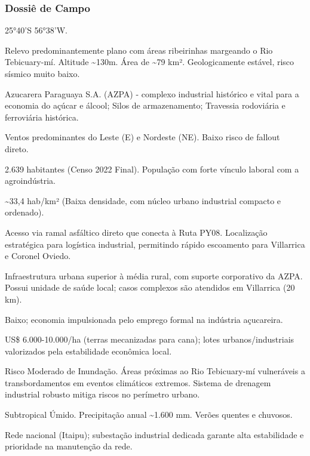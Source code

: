 \subsubsection{Dossiê de Campo}
\begin{description}[style=nextline,leftmargin=0.5cm,font=\bfseries]
\item[Coordenadas]  25°40'S 56°38'W.
\item[Topografia]  Relevo predominantemente plano com áreas ribeirinhas margeando o Rio Tebicuary-mí. Altitude \textasciitilde 130m. Área de \textasciitilde 79 km². Geologicamente estável, risco sísmico muito baixo.
\item[Alvos Estratégicos]  Azucarera Paraguaya S.A. (AZPA) - complexo industrial histórico e vital para a economia do açúcar e álcool; Silos de armazenamento; Travessia rodoviária e ferroviária histórica.
\item[Fallout]  Ventos predominantes do Leste (E) e Nordeste (NE). Baixo risco de fallout direto.
\item[População]  2.639 habitantes (Censo 2022 Final). População com forte vínculo laboral com a agroindústria.
\item[Densidade]  \textasciitilde 33,4 hab/\allowbreak km² (Baixa densidade, com núcleo urbano industrial compacto e ordenado).
\item[Vias de Acesso]  Acesso via ramal asfáltico direto que conecta à Ruta PY08. Localização estratégica para logística industrial, permitindo rápido escoamento para Villarrica e Coronel Oviedo.
\item[Serviços]  Infraestrutura urbana superior à média rural, com suporte corporativo da AZPA. Possui unidade de saúde local; casos complexos são atendidos em Villarrica (20 km).
\item[Custo de Vida]  Baixo; economia impulsionada pelo emprego formal na indústria açucareira.
\item[Preço da Terra]  US\$ 6.000-10.000/\allowbreak ha (terras mecanizadas para cana); lotes urbanos/\allowbreak industriais valorizados pela estabilidade econômica local.
\item[Hidrologia]  Risco Moderado de Inundação. Áreas próximas ao Rio Tebicuary-mí vulneráveis a transbordamentos em eventos climáticos extremos. Sistema de drenagem industrial robusto mitiga riscos no perímetro urbano.
\item[Clima]  Subtropical Úmido. Precipitação anual \textasciitilde 1.600 mm. Verões quentes e chuvosos.
\item[Energia]  Rede nacional (Itaipu); subestação industrial dedicada garante alta estabilidade e prioridade na manutenção da rede.

\end{description}
